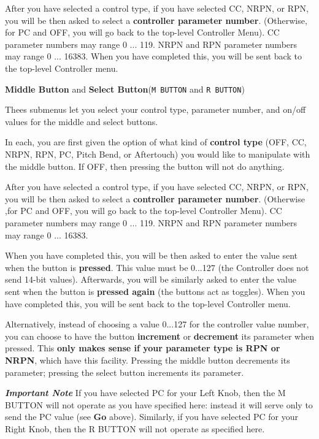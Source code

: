 \documentclass{article}
\begin{document}
\begin{description}
	After you have selected a control type, if you have selected CC, NRPN, or RPN, you will be then asked to select a {\bf controller parameter number}.  (Otherwise, for PC and OFF, you will go back to the top-level Controller Menu).  CC parameter numbers may range 0 ... 119.  NRPN and RPN parameter numbers may range 0 ... 16383. When you have completed this, you will be sent back to the top-level Controller menu.

	\item{\bf Middle Button} and {\bf Select Button}\quad (\texttt{M BUTTON} and \texttt{R BUTTON})
	
	Thees submenus let you select your control type, parameter number, and on/off values for the middle and select buttons.
	
	In each, you are first given the option of what kind of {\bf control type} (OFF, CC, NRPN, RPN, PC, Pitch Bend, or Aftertouch) %
you would like to manipulate with the middle button.  If OFF, then pressing the button will not do anything.

	After you have selected a control type, if you have selected CC, NRPN, or RPN, you will be then asked to select a {\bf controller parameter number}.  (Otherwise ,for PC and OFF, you will go back to the top-level Controller Menu).  CC parameter numbers may range 0 ... 119.  NRPN and RPN parameter numbers may range 0 ... 16383.
	
	When you have completed this, you will be then asked to enter the value sent when the button is {\bf pressed}.  This value must be 0...127 (the Controller does not send 14-bit values).  Afterwards, you will be similarly asked to enter the value sent when the button is {\bf pressed again} (the buttons act as toggles).  When you have completed this, you will be sent back to the top-level Controller menu.
	
	Alternatively, instead of choosing a value 0...127 for the controller value number, you can choose to have the button {\bf increment} or {\bf decrement} its parameter when pressed.  This {\bf only makes sense if your parameter type is RPN or NRPN}, which have this facility.  Pressing the middle button decrements its parameter; pressing the select button increments its parameter.   
	
	{\bf \textit{Important Note}\quad} If you have selected PC for your Left Knob, then the M BUTTON will not operate as you have specified here: instead it will serve only to send the PC value (see {\bf Go} above).  Similarly, if you have selected PC for your Right Knob, then the R BUTTON will not operate as specified here.
	

\end{description}
\end{document}
